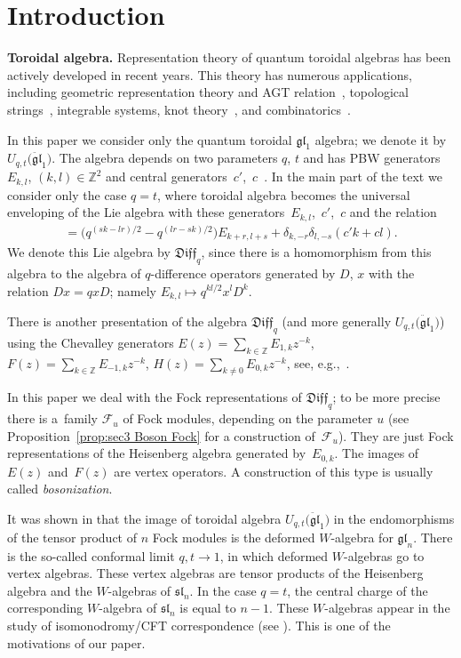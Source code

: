\documentclass[pdftex]{sigma}
\numberwithin{equation}{section}
\theoremstyle{definition}
\newcommand{\qD}{\mathfrak{Diff}_q}
\begin{document}
\section{Introduction}
{\bf Toroidal algebra.} Representation theory of quantum toroidal algebras has been actively de\-veloped in recent years. This theory has numerous applications, including geometric representation theory and AGT relation~\cite{N16}, topological strings~\cite{AFS}, integrable systems, knot theory~\cite{GN13}, and combinatorics~\cite{CM15}.

In this paper we consider only the quantum toroidal $\mathfrak{gl}_1$ algebra; we denote it by $U_{q,t}\big(\ddot{\mathfrak{gl}}_1\big)$. The algebra depends on two parameters $q$, $t$ and has PBW generators $E_{k,l}$, $(k,l)\in \mathbb{Z}^2$ and central generators~$c'$,~$c$~\cite{Burban}. In the main part of the text we consider only the case $q=t$, where toroidal algebra becomes the universal enveloping of the Lie algebra with these generators~$E_{k,l}$,~$c'$,~$c$ and the relation
\begin{gather*}
[E_{k,l} , E_{r,s} ] = \big( q^{(sk-lr)/2}-q^{(lr-sk)/2} \big) E_{k+r, l+s} + \delta_{k, -r} \delta_{l, -s} ( c' k + c l ).
\end{gather*}
We denote this Lie algebra by $\qD$, since there is a homomorphism from this algebra to the algebra of $q$-difference operators generated by $D$, $x$ with the relation $Dx=qxD$; namely $E_{k,l} \mapsto q^{kl/2} x^l D^k$.

There is another presentation of the algebra $\qD$ (and more generally $U_{q,t}\big(\ddot{\mathfrak{gl}}_1\big)$) using the Chevalley generators $E(z) = \sum\limits_{k \in \mathbb{Z}} E_{1,k} z^{-k}$, $F(z) = \sum\limits_{k \in \mathbb{Z}} E_{-1, k} z^{-k}$, $H(z) = \sum\limits_{k \neq 0} E_{0, k} z^{-k}$, see, e.g.,~\cite{Ts}.

In this paper we deal with the Fock representations of $\qD$; to be more precise there is a~family $\mathcal{F}_u$ of Fock modules, depending on the parameter $u$ (see Proposition~\ref{prop:sec3 Boson Fock} for a construction of~$\mathcal{F}_u$). They are just Fock representations of the Heisenberg algebra generated by~$E_{0,k}$. The images of~$E(z)$ and~$F(z)$ are vertex operators. A construction of this type is usually called \emph{bosonization}.

It was shown in \cite{FHHSY,N16} that the image of toroidal algebra $U_{q,t}\big(\ddot{\mathfrak{gl}}_1\big)$ in the endomorphisms of the tensor product of $n$ Fock modules is the deformed $W$-algebra for $\mathfrak{gl}_n$. There is the so-called conformal limit $q,t\rightarrow 1$, in which deformed $W$-algebras go to vertex algebras. These vertex algebras are tensor products of the Heisenberg algebra and the $W$-algebras of $\mathfrak{sl}_n$. In the case $q=t$, the central charge of the corresponding $W$-algebra of $\mathfrak{sl}_n$ is equal to $n-1$. These $W$-algebras appear in the study of isomonodromy/CFT correspondence (see \cite{GIL12,GM16}). This is one of the motivations of our paper.
\end{document}
